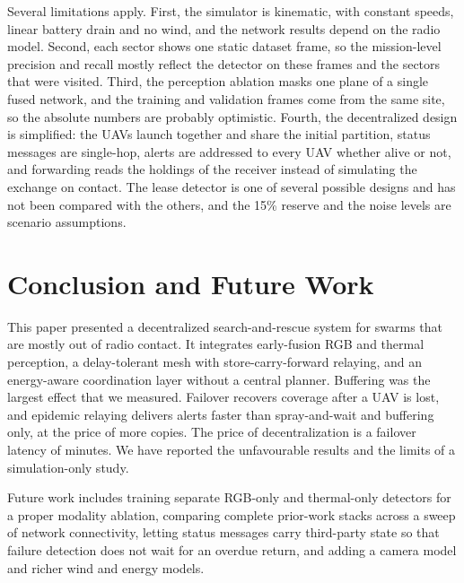 \documentclass[conference]{IEEEtran}
\begin{document}
Several limitations apply. First, the simulator is kinematic, with constant speeds, linear battery drain and no wind, and the network results depend on the radio model. Second, each sector shows one static dataset frame, so the mission-level precision and recall mostly reflect the detector on these frames and the sectors that were visited. Third, the perception ablation masks one plane of a single fused network, and the training and validation frames come from the same site, so the absolute numbers are probably optimistic. Fourth, the decentralized design is simplified: the UAVs launch together and share the initial partition, status messages are single-hop, alerts are addressed to every UAV whether alive or not, and forwarding reads the holdings of the receiver instead of simulating the exchange on contact. The lease detector is one of several possible designs and has not been compared with the others, and the 15\% reserve and the noise levels are scenario assumptions.

\section{Conclusion and Future Work}\label{sec:concl}
This paper presented a decentralized search-and-rescue system for swarms that are mostly out of radio contact. It integrates early-fusion RGB and thermal perception, a delay-tolerant mesh with store-carry-forward relaying, and an energy-aware coordination layer without a central planner. Buffering was the largest effect that we measured. Failover recovers coverage after a UAV is lost, and epidemic relaying delivers alerts faster than spray-and-wait and buffering only, at the price of more copies. The price of decentralization is a failover latency of minutes. We have reported the unfavourable results and the limits of a simulation-only study.

Future work includes training separate RGB-only and thermal-only detectors for a proper modality ablation, comparing complete prior-work stacks across a sweep of network connectivity, letting status messages carry third-party state so that failure detection does not wait for an overdue return, and adding a camera model and richer wind and energy models.
\end{document}
